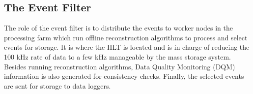     \subsection{The Event Filter}

      The role of the event filter is to distribute the events to worker nodes in the processing farm which run offline reconstruction algorithms to process and select events for storage. It is where the HLT is located and is in charge of reducing the 100 kHz rate of data to a few kHz manageable by the mass storage system. Besides running reconstruction algorithms, Data Quality Monitoring (DQM) information is also generated for consistency checks. Finally, the selected events are sent for storage to data loggers.
